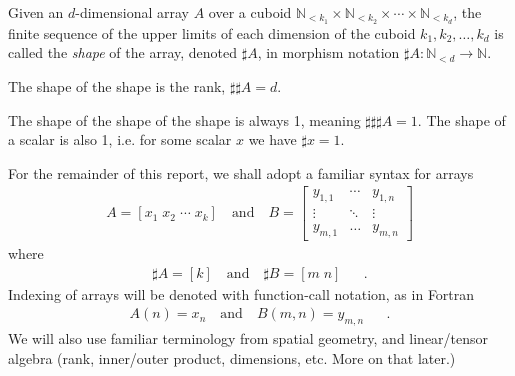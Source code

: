 \documentclass{DIKU-report-variant}
\newcommand\Nat{\mathbb{N}}
\begin{document}
\begin{definition}
  \label{def:shape}
  Given an \(d\)-dimensional array \(A\) over a cuboid
  \(\Nat_{<k_1} \times \Nat_{<k_2} \times \cdots \times \Nat_{<k_d}\),
  the finite sequence of the upper limits of each dimension of the cuboid
  \(k_1, k_2, \dots, k_d\) is called the \emph{shape} of the array, denoted
  \(\sharp A\), in morphism notation \(\sharp A : \Nat_{<d} \to \Nat\).
  
  The shape of the shape is the rank, \(\sharp \sharp A = d\).

  The shape of the shape of the shape is always 1, meaning \(\sharp \sharp \sharp A = 1\).
  The shape of a scalar is also 1, i.e. for some scalar \(x\) we have \(\sharp x = 1\).
\end{definition}

\begin{remark}
  \label{rem:syntax}
  For the remainder of this report, we shall adopt a familiar syntax for arrays
  \begin{align*}
    A = [ x_1\; x_2\; \cdots \; x_k ] \quad \text{and} \quad
    B = \begin{bmatrix}
      y_{1,1} & \cdots & y_{1,n} \\
      \vdots & \ddots & \vdots \\
      y_{m,1} & \dots  & y_{m,n} 
    \end{bmatrix}
  \end{align*}
  where
  \begin{align*}
    \sharp A = [k] \quad \text{and} \quad \sharp B = [ m\; n ] && .
  \end{align*}
  Indexing of arrays will be denoted with function-call notation, as in Fortran
  \begin{align*}
    A(n) = x_n \quad \text{and} \quad B(m,n) = y_{m,n} && .
  \end{align*}
  We will also use familiar terminology from spatial geometry, and linear/tensor algebra (rank,
  inner/outer product, dimensions, etc. More on that later.)
\end{remark}
\end{document}
